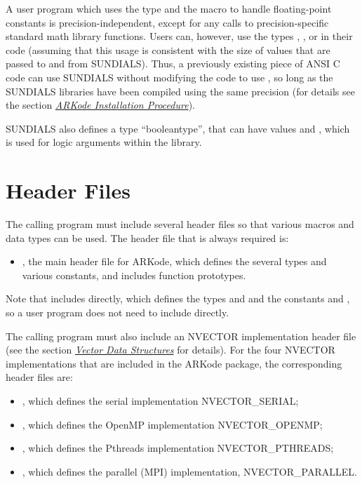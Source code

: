 \documentclass[letterpaper,10pt,english]{sphinxmanual}
\begin{document}
A user program which uses the type  and the  macro
to handle floating-point constants is precision-independent, except for
any calls to precision-specific standard math library functions.
Users can, however, use the types , , or  in their code (assuming that this usage is consistent with
the size of  values that are passed to and from SUNDIALS).
Thus, a previously existing piece of ANSI C code can use SUNDIALS
without modifying the code to use , so long as the
SUNDIALS libraries have been compiled using the same precision (for
details see the section {\hyperref[Install:installation]{\emph{ARKode Installation Procedure}}}).

SUNDIALS also defines a type ``booleantype'', that can have
values  and , which is used for logic arguments
within the library.


\section{Header Files}
\label{c_interface/General:header-files}
The calling program must include several header files so that various
macros and data types can be used. The header file that is always
required is:
\begin{itemize}
\item {} 
, the main header file for ARKode, which defines the
several types and various constants, and includes function
prototypes.

\end{itemize}

Note that  includes  directly, which
defines the types  and  and the
constants  and , so a user program does not need to
include  directly.

The calling program must also include an NVECTOR implementation
header file (see the section {\hyperref[nvectors/index:nvectors]{\emph{Vector Data Structures}}} for details).  For the four
NVECTOR implementations that are included in the ARKode package, the
corresponding header files are:
\begin{itemize}
\item {} 
, which defines the serial implementation
NVECTOR\_SERIAL;

\item {} 
, which defines the OpenMP implementation
NVECTOR\_OPENMP;

\item {} 
, which defines the Pthreads implementation
NVECTOR\_PTHREADS;

\item {} 
, which defines the parallel (MPI)
implementation, NVECTOR\_PARALLEL.

\end{itemize}
\end{document}
